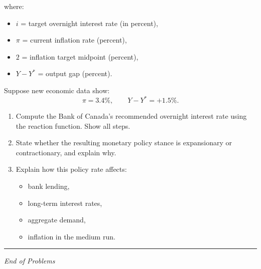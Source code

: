 \documentclass[12pt]{article}
\begin{document}
where:
\begin{itemize}
    \item \( i \) = target overnight interest rate (in percent),
    \item \( \pi \) = current inflation rate (percent),
    \item \( 2 \) = inflation target midpoint (percent),
    \item \( Y - Y^* \) = output gap (percent).
\end{itemize}

Suppose new economic data show:
\[
\pi = 3.4\%, \qquad Y - Y^* = +1.5\%.
\]



\begin{enumerate}
    \item[(a)] Compute the Bank of Canada's recommended overnight interest rate using the reaction function. Show all steps.
    
    \item[(b)] State whether the resulting monetary policy stance is expansionary or contractionary, and explain why.
    
    \item[(c)] Explain how this policy rate affects:
    \begin{itemize}
        \item bank lending,
        \item long-term interest rates,
        \item aggregate demand,
        \item inflation in the medium run.
    \end{itemize}
\end{enumerate}

\hrule
\vspace{1em}

\begin{center}
\textit{End of Problems}
\end{center}
\end{document}
